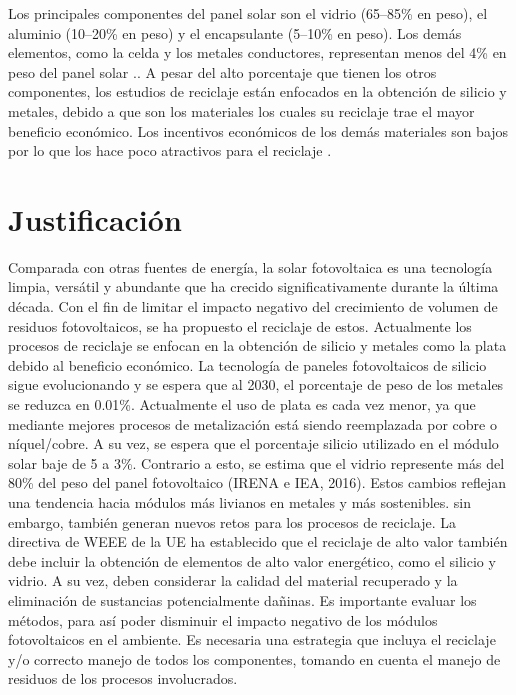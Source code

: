 Los principales componentes del panel solar son el vidrio (65–85\% en peso), el aluminio (10–20\% en peso) y el encapsulante (5–10\% en peso). Los demás elementos, como la celda y los metales conductores, representan menos del 4\% en peso del panel solar \citep{Fiandra2019}.. A pesar del alto porcentaje que tienen los otros componentes, los estudios de reciclaje están enfocados en la obtención de silicio y metales, debido a que son los materiales los cuales su reciclaje trae el mayor beneficio económico. Los incentivos económicos de los demás materiales son bajos por lo que los hace poco atractivos para el reciclaje \citep{SamKumar2020}.  


\section{Justificación}
\label{sec:Justificación}
Comparada con otras fuentes de energía, la solar fotovoltaica es una tecnología limpia, versátil y abundante que ha crecido significativamente durante la última década. Con el fin de limitar el impacto negativo del crecimiento de volumen de residuos fotovoltaicos, se ha propuesto el reciclaje de estos. Actualmente los procesos de reciclaje se enfocan en la obtención de silicio y metales como la plata debido al beneficio económico. La tecnología de paneles fotovoltaicos de silicio sigue evolucionando y se espera que al 2030, el porcentaje de peso de los metales se reduzca en 0.01\%. Actualmente el uso de plata es cada vez menor, ya que mediante mejores procesos de metalización está siendo reemplazada por cobre o níquel/cobre. A su vez, se espera que el porcentaje silicio utilizado en el módulo solar baje de 5 a 3\%. Contrario a esto, se estima que el vidrio represente más del 80\% del peso del panel fotovoltaico (IRENA e IEA, 2016). Estos cambios reflejan una tendencia hacia módulos más livianos en metales y más sostenibles. sin embargo, también generan nuevos retos para los procesos de reciclaje. La directiva de WEEE de la UE ha establecido que el reciclaje de alto valor también debe incluir la obtención de elementos de alto valor energético, como el silicio y vidrio. A su vez, deben considerar la calidad del material recuperado y la eliminación de sustancias potencialmente dañinas\citep{Pagnanelli2019,Irena2016}. 
Es importante evaluar los métodos, para así poder disminuir el impacto negativo de los módulos fotovoltaicos en el ambiente. Es necesaria una estrategia que incluya el reciclaje y/o correcto manejo de todos los componentes, tomando en cuenta el manejo de residuos de los procesos involucrados.


